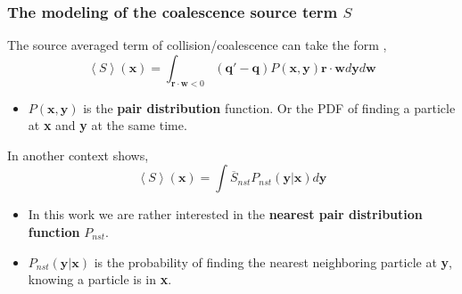 \documentclass{sintefbeamer}
\newcommand{\avg}[1]{\left<#1\right>}
\newcommand{\nstavg}[1]{\overline{#1}_{nst}}
\begin{document}
\begin{frame}
  \frametitle{The modeling of the coalescence source term $S$}
  The source averaged term of collision/coalescence can take the form \citep{rao2008introduction,fede2015monte},
  \begin{equation*}
    \avg{S}(\textbf{x}) = \int_{\textbf{r} \cdot \textbf{w} < 0} \left(\textbf{q}' - \textbf{q}\right)
    P(\textbf{x}, \textbf{y})\textbf{r} \cdot \textbf{w} d\textbf{y} d\textbf{w}
  \end{equation*}
  \begin{itemize}
  \item $P(\textbf{x},\textbf{y})$ is the \textbf{pair distribution} function. Or the PDF of finding a particle at \textbf{x} and \textbf{y} at the same time. 
  \end{itemize}
  In another context \citet{zhang2021ensemble} shows,
  \begin{equation*}
    \avg{S}(\textbf{x}) = \int \nstavg{S}P_{nst}(\textbf{y}|\textbf{x})d\textbf{y}
  \end{equation*}

  \begin{itemize}
    \item 
    In this work we are rather interested in the \textbf{nearest pair distribution function} $P_{nst}$.
    \item $P_{nst}(\textbf{y}|\textbf{x}) $ is the probability of finding the nearest neighboring particle at \textbf{y}, knowing a particle is in \textbf{x}.
  \end{itemize}
\end{frame}



\end{document}
